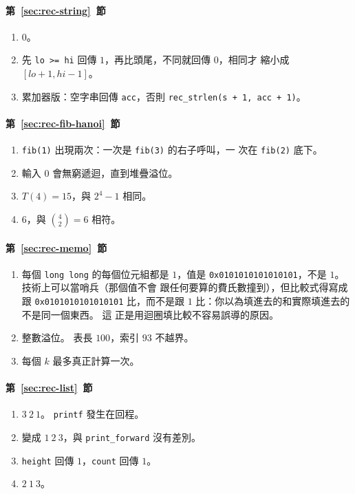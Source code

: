 \paragraph{第~\ref{sec:rec-string}~節}
\begin{enumerate}
\item $0$。
\item 先 \texttt{lo >= hi} 回傳 $1$，再比頭尾，不同就回傳 $0$，相同才
縮小成 $[lo+1, hi-1]$。
\item 累加器版：空字串回傳 \texttt{acc}，否則
\texttt{rec\_strlen(s + 1, acc + 1)}。
\end{enumerate}

\paragraph{第~\ref{sec:rec-fib-hanoi}~節}
\begin{enumerate}
\item \texttt{fib(1)} 出現兩次：一次是 \texttt{fib(3)} 的右子呼叫，一
次在 \texttt{fib(2)} 底下。
\item 輸入 $0$ 會無窮遞迴，直到堆疊溢位。
\item $T(4) = 15$，與 $2^4 - 1$ 相同。
\item $6$，與 $\binom{4}{2} = 6$ 相符。
\end{enumerate}

\paragraph{第~\ref{sec:rec-memo}~節}
\begin{enumerate}
\item 每個 \texttt{long long} 的每個位元組都是 $1$，值是
\texttt{0x0101010101010101}，不是 $1$。 技術上可以當哨兵（那個值不會
跟任何要算的費氏數撞到），但比較式得寫成跟 \texttt{0x0101010101010101}
比，而不是跟 $1$ 比：你以為填進去的和實際填進去的不是同一個東西。 這
正是用迴圈填比較不容易誤導的原因。
\item 整數溢位。 表長 $100$，索引 $93$ 不越界。
\item 每個 $k$ 最多真正計算一次。
\end{enumerate}

\paragraph{第~\ref{sec:rec-list}~節}
\begin{enumerate}
\item $3\ 2\ 1$。 \texttt{printf} 發生在回程。
\item 變成 $1\ 2\ 3$，與 \texttt{print\_forward} 沒有差別。
\item \texttt{height} 回傳 $1$，\texttt{count} 回傳 $1$。
\item $2\ 1\ 3$。
\end{enumerate}

